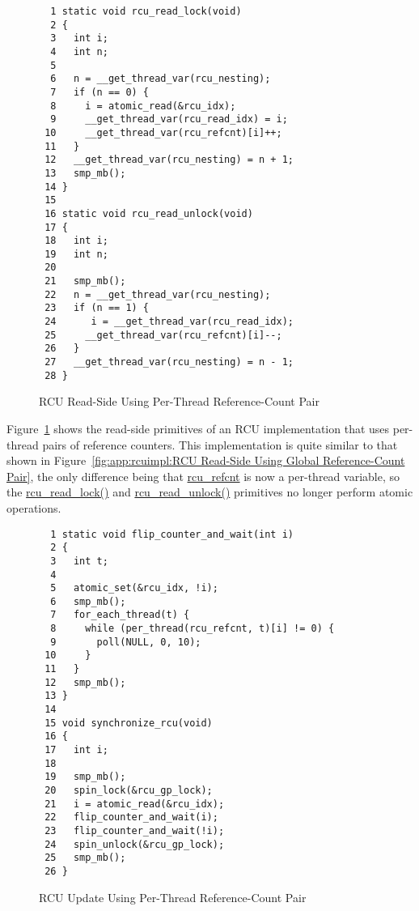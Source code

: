 \begin{figure}[tbp]
{ \scriptsize
\begin{verbatim}
  1 static void rcu_read_lock(void)
  2 {
  3   int i;
  4   int n;
  5 
  6   n = __get_thread_var(rcu_nesting);
  7   if (n == 0) {
  8     i = atomic_read(&rcu_idx);
  9     __get_thread_var(rcu_read_idx) = i;
 10     __get_thread_var(rcu_refcnt)[i]++;
 11   }
 12   __get_thread_var(rcu_nesting) = n + 1;
 13   smp_mb();
 14 }
 15 
 16 static void rcu_read_unlock(void)
 17 {
 18   int i;
 19   int n;
 20 
 21   smp_mb();
 22   n = __get_thread_var(rcu_nesting);
 23   if (n == 1) {
 24      i = __get_thread_var(rcu_read_idx);
 25     __get_thread_var(rcu_refcnt)[i]--;
 26   }
 27   __get_thread_var(rcu_nesting) = n - 1;
 28 }
\end{verbatim}
}
\caption{RCU Read-Side Using Per-Thread Reference-Count Pair}
\label{fig:app:rcuimpl:RCU Read-Side Using Per-Thread Reference-Count Pair}
\end{figure}

Figure~\ref{fig:app:rcuimpl:RCU Read-Side Using Per-Thread Reference-Count Pair}
shows the read-side primitives of an RCU implementation that uses per-thread
pairs of reference counters.
This implementation is quite similar to that shown in
Figure~\ref{fig:app:rcuimpl:RCU Read-Side Using Global Reference-Count Pair},
the only difference being that \url{rcu_refcnt} is now a per-thread
variable, so the \url{rcu_read_lock()} and
\url{rcu_read_unlock()} primitives no longer perform atomic operations.

 \QuickQuizEnd

\begin{figure}[tbp]
{ \scriptsize
\begin{verbatim}
  1 static void flip_counter_and_wait(int i)
  2 {
  3   int t;
  4 
  5   atomic_set(&rcu_idx, !i);
  6   smp_mb();
  7   for_each_thread(t) {
  8     while (per_thread(rcu_refcnt, t)[i] != 0) {
  9       poll(NULL, 0, 10);
 10     }
 11   }
 12   smp_mb();
 13 }
 14 
 15 void synchronize_rcu(void)
 16 {
 17   int i;
 18 
 19   smp_mb();
 20   spin_lock(&rcu_gp_lock);
 21   i = atomic_read(&rcu_idx);
 22   flip_counter_and_wait(i);
 23   flip_counter_and_wait(!i);
 24   spin_unlock(&rcu_gp_lock);
 25   smp_mb();
 26 }
\end{verbatim}
}
\caption{RCU Update Using Per-Thread Reference-Count Pair}
\label{fig:app:rcuimpl:RCU Update Using Per-Thread Reference-Count Pair}
\end{figure}

